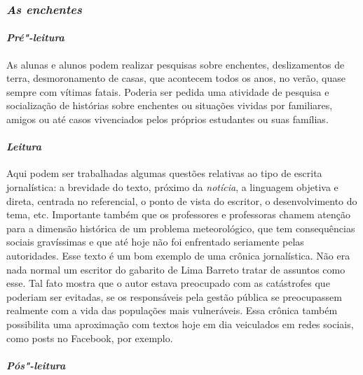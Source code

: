 \documentclass{extarticle}
\begin{document}
\subsubsection{\textit{As enchentes}}
\paragraph{\textit{Pré"-leitura}}

As alunas e alunos podem realizar pesquisas sobre enchentes,
deslizamentos de terra, desmoronamento de casas, que acontecem todos os
anos, no verão, quase sempre com vítimas fatais. Poderia ser pedida uma
atividade de pesquisa e socialização de histórias sobre enchentes ou
situações vividas por familiares, amigos ou até casos vivenciados pelos
próprios estudantes ou suas famílias.






\paragraph{\textit{Leitura}}

Aqui podem ser trabalhadas algumas questões relativas ao tipo de
escrita jornalística: a brevidade do texto, próximo da \emph{notícia}, a
linguagem objetiva e direta, centrada no referencial, o ponto de vista
do escritor, o desenvolvimento do tema, etc. Importante também que os
professores e professoras chamem atenção para a dimensão histórica de um
problema meteorológico, que tem consequências sociais gravíssimas e que
até hoje não foi enfrentado seriamente pelas autoridades. Esse texto é
um bom exemplo de uma crônica jornalística. Não era nada normal um
escritor do gabarito de Lima Barreto tratar de assuntos como esse. Tal
fato mostra que o autor estava preocupado com as catástrofes que
poderiam ser evitadas, se os responsáveis pela gestão pública se
preocupassem realmente com a vida das populações mais vulneráveis. Essa
crônica também possibilita uma aproximação com textos hoje em dia
veiculados em redes sociais, como posts no Facebook, por exemplo.

\paragraph{\textit{Pós"-leitura}}
\end{document}
